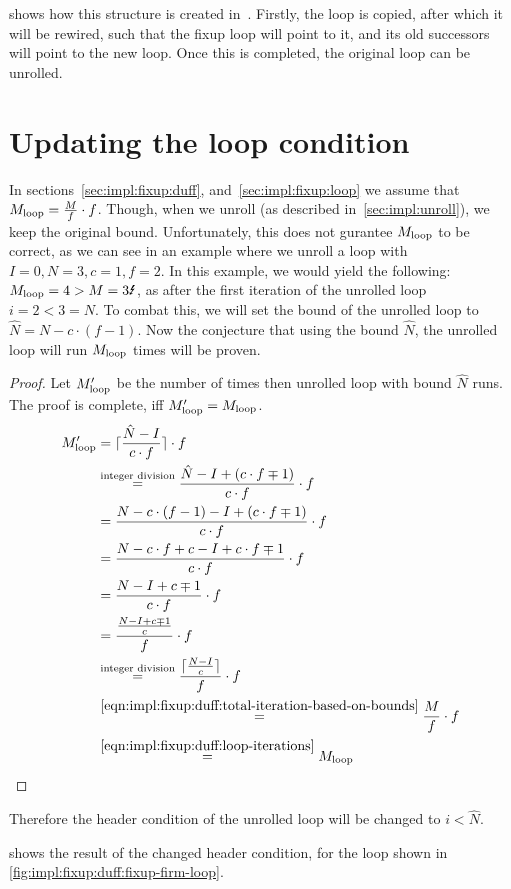  shows how this structure is created in~\libFIRM.
Firstly, the loop is copied, after which it will be rewired, such that the fixup loop will point to it, and its old successors will point to the new loop.
Once this is completed, the original loop can be unrolled.



\section{Updating the loop condition}\label{sec:impl:fixup:header-cond}

In sections~\ref{sec:impl:fixup:duff}, and~\ref{sec:impl:fixup:loop} we assume that $M_{\text{loop}} = \frac{M}{f} \cdot f$.
Though, when we unroll (as described in~\cref{sec:impl:unroll}), we keep the original bound.
Unfortunately, this does not gurantee $M_{\text{loop}}$ to be correct, as we can see in an example where we unroll a loop with $I = 0, N = 3, c = 1, f = 2$.
In this example, we would yield the following: $\Mloop = 4 > M = 3 \mLightning$, as after the first iteration of the unrolled loop $i = 2 < 3 = N$.
To combat this, we will set the bound of the unrolled loop to $\hat{N} = N - c \cdot (f - 1)$.
Now the conjecture that using the bound $\hat{N}$, the unrolled loop will run $M_{\text{loop}}$ times will be proven.
\begin{proof}
    Let $M_{\text{loop}}'$ be the number of times then unrolled loop with bound $\hat{N}$ runs.
    The proof is complete, iff $M_{\text{loop}}' = M_{\text{loop}}$.
    \begin{align*}
        M_{\text{loop}}' &= \lceil{}\frac{\hat{N} - I}{c \cdot f}\rceil{} \cdot f\\
        &\overset{\text{integer division}}{=} \frac{\hat{N} - I + (c \cdot f \mp 1)}{c \cdot f} \cdot f\\
        &= \frac{N - c \cdot (f - 1) - I + (c \cdot f \mp 1)}{c \cdot f} \cdot f\\
        &= \frac{N - c \cdot f + c - I + c \cdot f \mp 1}{c \cdot f} \cdot f\\
        &= \frac{N - I + c \mp 1}{c \cdot f} \cdot f\\
        &= \frac{\frac{N - I + c \mp 1}{c}}{f} \cdot f\\
        &\overset{\text{integer division}}{=} \frac{\lceil{}\frac{N - I}{c}\rceil{}}{f} \cdot f\\
        &\overset{\ref{eqn:impl:fixup:duff:total-iteration-based-on-bounds}}{=} \frac{M}{f} \cdot f\\
        &\overset{\ref{eqn:impl:fixup:duff:loop-iterations}}{=} M_{\text{loop}}
    \end{align*}
\end{proof}

Therefore the header condition of the unrolled loop will be changed to $i < \hat{N}$.

 shows the result of the changed header condition, for the loop shown in \cref{fig:impl:fixup:duff:fixup-firm-loop}.

